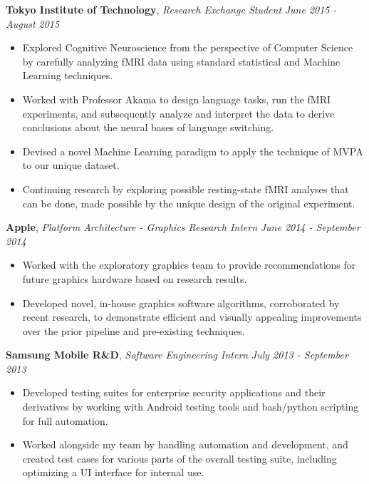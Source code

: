 \documentclass[9pt]{article}
\newenvironment{changemargin}[2]{%
  \begin{list}{}{%
    \setlength{\topsep}{0pt}%
    \setlength{\leftmargin}{#1}%
    \setlength{\rightmargin}{#2}%
    \setlength{\listparindent}{\parindent}%
    \setlength{\itemindent}{\parindent}%
    \setlength{\parsep}{\parskip}%
  }%
  \item[]}{\end{list}
}
\newenvironment{body} {
	\vspace*{-16pt}
	\begin{changemargin}{-0.25in}{-0.5in}
  }	
	{\end{changemargin}
}
\begin{document}
\begin{body}
	\textbf{Tokyo Institute of Technology}, \emph{Research Exchange Student} \hfill \emph{June 2015 - August 2015}\\
	\vspace*{-3pt}
	\begin{itemize} \itemsep -0pt %
	\item Explored Cognitive Neuroscience from the perspective of Computer Science by carefully analyzing fMRI data using standard statistical and Machine Learning techniques.
	\item Worked with Professor Akama to design language tasks, run the fMRI experiments, and subsequently analyze and interpret the data to derive conclusions about the neural bases of language switching.
	\item Devised a novel Machine Learning paradigm to apply the technique of MVPA to our unique dataset.
	\item Continuing research by exploring possible resting-state fMRI analyses that can be done, made possible by the unique design of the original experiment.
	\end{itemize}
	\vspace*{1pt}
	\textbf{Apple}, \emph{Platform Architecture - Graphics Research Intern} \hfill \emph{June 2014 - September 2014}\\
	\vspace*{-3pt}
	\begin{itemize} \itemsep -0pt %
	\item Worked with the exploratory graphics team to provide recommendations for future graphics hardware based on research results.
	\item Developed novel, in-house graphics software algorithms, corroborated by recent research, to demonstrate efficient and visually appealing improvements over the prior pipeline and pre-existing techniques. 
	\end{itemize}
	\vspace*{1pt}
	\textbf{Samsung Mobile R\&D}, \emph{Software Engineering Intern} \hfill \emph{July 2013 - September 2013}\\
	\vspace*{-3pt}
	\begin{itemize} \itemsep -0pt %
	\item Developed testing suites for enterprise security applications and their derivatives by working with Android testing tools and bash/python scripting for full automation.
	\item Worked alongside my team by handling automation and development, and created test cases for various parts of the overall testing suite, including optimizing a UI interface for internal use.

\end{itemize}
\end{body}
\end{document}
